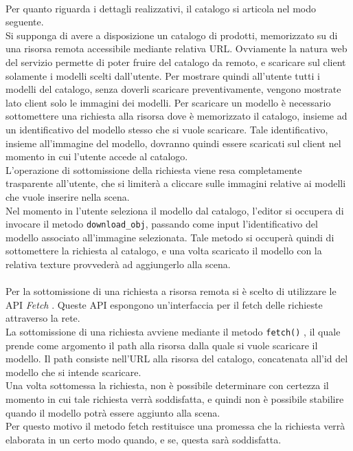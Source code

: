 \\
Per quanto riguarda i dettagli realizzativi, il catalogo si articola nel modo seguente.
\\
Si supponga di avere a disposizione un catalogo di prodotti, memorizzato su di una risorsa remota accessibile mediante relativa URL. Ovviamente la natura web del servizio permette di poter fruire del catalogo da remoto, e scaricare sul client solamente i modelli scelti dall'utente. Per mostrare quindi all’utente tutti i modelli del catalogo, senza doverli scaricare preventivamente, vengono mostrate lato client solo le immagini dei modelli.
Per scaricare un modello è necessario sottomettere una richiesta alla risorsa dove è memorizzato il catalogo, insieme ad un identificativo del modello stesso che si vuole scaricare. Tale identificativo, insieme all’immagine del modello, dovranno quindi essere scaricati sul client nel momento in cui l’utente accede al catalogo.
\\
L’operazione di sottomissione della richiesta viene resa completamente trasparente all’utente, che si limiterà a cliccare sulle immagini relative ai modelli che vuole inserire nella scena.
\\ 
Nel momento in l’utente seleziona il modello dal catalogo, l’editor si occupera di invocare il metodo \texttt{download\_obj}, passando come input l’identificativo del modello associato all’immagine selezionata. Tale metodo si occuperà quindi di sottomettere la richiesta al catalogo, e una volta scaricato il modello con la relativa texture provvederà ad aggiungerlo alla scena. 
\\
\\
Per la sottomissione di una richiesta a risorsa remota si è scelto di utilizzare le API \emph{Fetch} \cite{fetchapi} . Queste API espongono un’interfaccia per il fetch delle richieste attraverso la rete.
\\ 
La sottomissione di una richiesta avviene mediante il metodo \texttt{fetch()} , il quale prende come argomento il path alla risorsa dalla quale si vuole scaricare il modello. Il path consiste nell’URL alla risorsa del catalogo, concatenata all’id del modello che si intende scaricare.
\\
Una volta sottomessa la richiesta, non è possibile determinare con certezza il momento in cui tale richiesta verrà soddisfatta, e quindi non è possibile stabilire quando il modello potrà essere aggiunto alla scena.
\\
Per questo motivo il metodo fetch restituisce una promessa che la richiesta verrà elaborata in un certo modo quando, e se, questa sarà soddisfatta.
